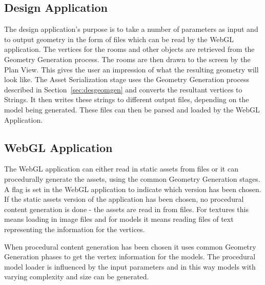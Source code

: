 \subsection{Design Application}
The design application's purpose is to take a number of parameters as input and to output geometry in the form of files which can be read by the WebGL application.
The vertices for the rooms and other objects are retrieved from the Geometry Generation process.
The rooms are then drawn to the screen by the Plan View.
This gives the user an impression of what the resulting geometry will look like.
The Asset Serialization stage uses the Geometry Generation process described in Section~\ref{sec:desgeomgen} and converts the resultant vertices to Strings.
It then writes these strings to different output files, depending on the model being generated. 
These files can then be parsed and loaded by the WebGL Application.

\subsection{WebGL Application}
The WebGL application can either read in static assets from files or it can procedurally generate the assets, using the common Geometry Generation stages.
A flag is set in the WebGL application to indicate which version has been chosen.
If the static assets version of the application has been chosen, no procedural content generation is done - the assets are read in from files.
For textures this means loading in image files and for models it means reading files of text representing the information for the vertices.

When procedural content generation has been chosen it uses common Geometry Generation phases to get the vertex information for the models.
The procedural model loader is influenced by the input parameters and in this way models with varying complexity and size can be generated.

